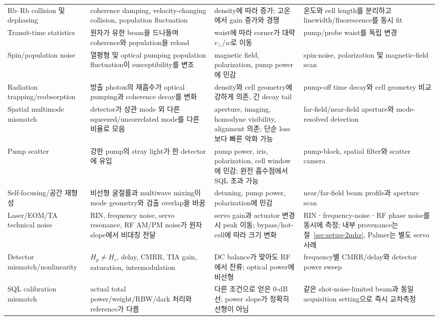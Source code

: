 \documentclass[11pt,a4paper]{article}
\begin{document}
\begin{longtable}{L{3.0cm}L{4.0cm}L{4.0cm}L{4.0cm}}
Rb--Rb collision 및 dephasing & coherence damping, velocity-changing collision,
population fluctuation & density에 따라 증가; 고온에서 gain 증가와 경쟁
\cite{Glorieux2023} & 온도와
cell length를 분리하고 linewidth/fluorescence를 동시 fit\\

Transit-time statistics & 원자가 유한 beam을 드나들며 coherence와 population을 reload &
waist에 따라 corner가 대략 $v_{\perp}/w$로 이동 & pump/probe waist를 독립 변경\\

Spin/population noise & 열평형 및 optical pumping population fluctuation이 susceptibility를
변조 & magnetic field, polarization, pump power에 민감\cite{Swar2018} & spin-noise,
polarization 및 magnetic-field scan\\

Radiation trapping/reabsorption & 방출 photon의 재흡수가 optical pumping과 coherence
decay를 변화 & density와 cell geometry에 강하게 의존, 긴 decay tail
\cite{Matsko2001,Rosenberry2007} & pump-off time decay와 cell geometry 비교\\

Spatial multimode mismatch & detector가 상관 mode 외 다른 squeezed/uncorrelated mode를
다른 비율로 모음 & aperture, imaging, homodyne visibility, alignment 의존;
단순 loss보다 빠른 악화 가능\cite{Gupta2020} & far-field/near-field aperture와
mode-resolved detection\\

Pump scatter & 강한 pump의 stray light가 한 detector에 유입 & pump power, iris,
polarization, cell window에 민감; 완전 흡수점에서 SQL 초과 가능
\cite{Jasperse2011} & pump-block, spatial filter와 scatter camera\\

Self-focusing/공간 재형성 & 비선형 굴절률과 multiwave mixing이 mode geometry와
검출 overlap을 바꿈 & detuning, pump power, polarization에 민감\cite{Ho1991} &
near/far-field beam profile과 aperture scan\\

Laser/EOM/TA technical noise & RIN, frequency noise, servo resonance, RF AM/PM noise가
원자 slope에서 비대칭 전달 & servo gain과 actuator 변경 시 peak 이동; bypass/hot-cell에
따라 크기 변화\cite{Sim2025,SimLab231020,SimLab231110,SimLab231208,
SimLab231222,SimLab240213,Wu2019,McIntyre1993,Martinelli2004,deAlmeida2025} &
RINㆍfrequency-noiseㆍRF phase noise를 동시에 측정; 내부 provenance는
절~\ref{sec:setup-2mhz}, Palmer는 별도 servo 사례\\

Detector mismatch/nonlinearity & $H_p\ne H_c$, delay, CMRR, TIA gain, saturation,
intermodulation & DC balance가 맞아도 RF에서 잔류; optical power에 비선형 & frequency별
CMRR/delay와 detector power sweep\cite{Painchaud2009,McKenzie2007}\\

SQL calibration mismatch & actual total power/weight/RBW/dark 처리와 reference가 다름 &
다른 조건으로 얻은 0-dB 선; power slope가 정확히 선형이 아님 & 같은 shot-noise-limited
beam과 동일 acquisition setting으로 즉시 교차측정\\
\end{longtable}
\end{document}
